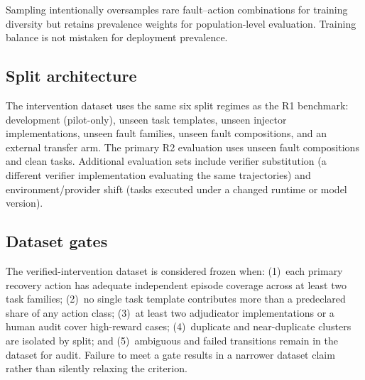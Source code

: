 Sampling intentionally oversamples rare fault--action combinations for
training diversity but retains prevalence weights for population-level
evaluation. Training balance is not mistaken for deployment prevalence.

\subsection{Split architecture}

The intervention dataset uses the same six split regimes as the R1
benchmark: development (pilot-only), unseen task templates, unseen injector
implementations, unseen fault families, unseen fault compositions, and an
external transfer arm. The primary R2 evaluation uses unseen fault
compositions and clean tasks. Additional evaluation sets include verifier
substitution (a different verifier implementation evaluating the same
trajectories) and environment/provider shift (tasks executed under a
changed runtime or model version).

\subsection{Dataset gates}

The verified-intervention dataset is considered frozen when: (1)~each
primary recovery action has adequate independent episode coverage across at
least two task families; (2)~no single task template contributes more than
a predeclared share of any action class; (3)~at least two adjudicator
implementations or a human audit cover high-reward cases; (4)~duplicate and
near-duplicate clusters are isolated by split; and (5)~ambiguous and failed
transitions remain in the dataset for audit. Failure to meet a gate results
in a narrower dataset claim rather than silently relaxing the criterion.
